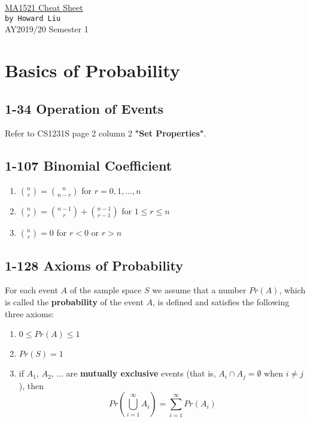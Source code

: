 \documentclass[12pt,landscape]{article}
\begin{document}
    \raggedright
    \footnotesize
    \begin{multicols}{3}
    \setlength{\premulticols}{1pt}
    \setlength{\postmulticols}{1pt}
    \setlength{\multicolsep}{1pt}
    \setlength{\columnsep}{2pt}
    
    \begin{flushleft}
        \large{
            \underline{MA1521 Cheat Sheet} \\
            \texttt{by Howard Liu} \\
            AY2019/20 Semester 1
        }
    \end{flushleft}

    \section{Basics of Probability}
    
    \subsection{1-34 Operation of Events}
    Refer to CS1231S page 2 column 2 \textbf{"Set Properties"}.
    
    \subsection{1-107 Binomial Coefficient}
    \begin{enumerate}
        \item ${n \choose r} = {n \choose n-r}$ for $r = 0, 1, \dots, n$
        \item ${n \choose r} = {n-1 \choose r} + {n-1 \choose r-1}$ for $1 \leq r \leq n$
        \item ${n \choose r} = 0$ for $r < 0$ or $r > n$
    \end{enumerate}

    \subsection{1-128 Axioms of Probability}
    For each event $A$ of the sample space $S$ we assume that a number $Pr(A)$, which is called the \textbf{probability} of the event $A$, is defined and satisfies the following three axioms:
    \begin{enumerate}
        \item $0 \leq Pr(A) \leq 1$
        \item $Pr(S) = 1$
        \item if $A_1$, $A_2$, $\dots$ are \textbf{mutually exclusive} events (that is, $A_i \cap A_j = \emptyset$ when $i \neq j$), then
            $$ Pr(\bigcup\limits_{i = 1}^{\infty} A_i) = \sum_{i = 1}^{\infty} Pr(A_i) $$
    \end{enumerate}
    

\end{multicols}
\end{document}
